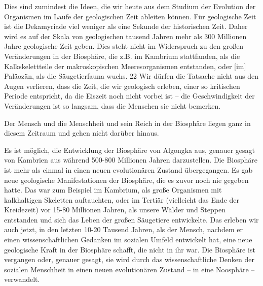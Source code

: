 \documentclass[11pt,a4paper]{book}
\begin{document}
Dies sind zumindest die Ideen, die wir heute aus dem Studium der Evolution der
Organismen im Laufe der geologischen Zeit ableiten können. Für geologische
Zeit ist die Dekamyriade viel weniger als eine Sekunde der historischen
Zeit. Daher wird es auf der Skala von geologischen tausend Jahren mehr als 300
Millionen Jahre geologische Zeit geben. Dies steht nicht im Widerspruch zu den
großen Veränderungen in der Biosphäre, die z.B. im Kambrium stattfanden, als
die Kalkskelettteile der makroskopischen Meeresorganismen entstanden, oder
[im] Paläozän, als die Säugetierfauna wuchs. 22 Wir dürfen die Tatsache nicht
aus den Augen verlieren, dass die Zeit, die wir geologisch erleben, einer so
kritischen Periode entspricht, da die Eiszeit noch nicht vorbei ist -- die
Geschwindigkeit der Veränderungen ist so langsam, dass die Menschen sie nicht
bemerken.

Der Mensch und die Menschheit und sein Reich in der Biosphäre liegen ganz in
diesem Zeitraum und gehen nicht darüber hinaus.

Es ist möglich, die Entwicklung der Biosphäre von Algongka aus, genauer gesagt
von Kambrien aus während 500-800 Millionen Jahren darzustellen. Die Biosphäre
ist mehr als einmal in einen neuen evolutionären Zustand übergegangen. Es gab
neue geologische Manifestationen der Biosphäre, die es zuvor noch nie gegeben
hatte. Das war zum Beispiel im Kambrium, als große Organismen mit kalkhaltigen
Skeletten auftauchten, oder im Tertiär (vielleicht das Ende der Kreidezeit)
vor 15-80 Millionen Jahren, als unsere Wälder und Steppen entstanden und sich
das Leben der großen Säugetiere entwickelte. Das erleben wir auch jetzt, in
den letzten 10-20 Tausend Jahren, als der Mensch, nachdem er einen
wissenschaftlichen Gedanken im sozialen Umfeld entwickelt hat, eine neue
geologische Kraft in der Biosphäre schafft, die nicht in ihr war. Die
Biosphäre ist vergangen oder, genauer gesagt, sie wird durch das
wissenschaftliche Denken der sozialen Menschheit in einen neuen evolutionären
Zustand -- in eine Noosphäre -- verwandelt.
\end{document}
